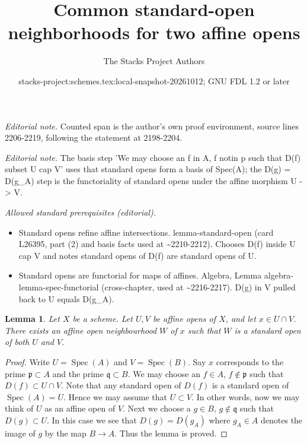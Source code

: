 \documentclass{stacks-project}
\title{Common standard-open neighborhoods for two affine opens}
\author{The Stacks Project Authors}
\date{stacks-project:schemes.tex:local-snapshot-20261012; GNU FDL 1.2 or later}
\theoremstyle{plain}
\newtheorem{lemma}[subsection]{Lemma}
\theoremstyle{definition}
\theoremstyle{remark}
\numberwithin{equation}{subsection}
\def\Spec{\mathop{\mathrm{Spec}}}
\begin{document}
\maketitle
\noindent\textit{Editorial note.} Counted span is the author's own proof environment, source lines 2206-2219, following the statement at 2198-2204.\par\medskip
\noindent\textit{Editorial note.} The basis step 'We may choose an f in A, f notin p such that D(f) subset U cap V' uses that standard opens form a basis of Spec(A); the D(g) = D(g\_A) step is the functoriality of standard opens under the affine morphism U -> V.\par\medskip
\noindent\textit{Allowed standard prerequisites (editorial).}\begin{itemize}
\item Standard opens refine affine intersections. lemma-standard-open (card L26395, part (2) and basis facts used at \textasciitilde{}2210-2212). Chooses D(f) inside U cap V and notes standard opens of D(f) are standard opens of U.
\item Standard opens are functorial for maps of affines. Algebra, Lemma algebra-lemma-spec-functorial (cross-chapter, used at \textasciitilde{}2216-2217). D(g) in V pulled back to U equals D(g\_A).
\end{itemize}\medskip
\begin{lemma}
\label{lemma-standard-open-two-affines}
Let $X$ be a scheme.
Let $U, V$ be affine opens of $X$, and let $x \in U \cap V$.
There exists an affine open neighbourhood $W$ of $x$
such that $W$ is a standard open of both $U$ and $V$.
\end{lemma}

\begin{proof}
Write $U = \Spec(A)$ and $V = \Spec(B)$.
Say $x$ corresponds to the prime $\mathfrak p \subset A$
and the prime $\mathfrak q \subset B$.
We may choose an $f \in A$, $f \not \in \mathfrak p$ such that
$D(f) \subset U \cap V$. Note that any standard open of $D(f)$
is a standard open of $\Spec(A) = U$. Hence we may assume
that $U \subset V$. In other words, now we may think of $U$
as an affine open of $V$. Next we choose a
$g \in B$, $g \not \in \mathfrak q$ such that
$D(g) \subset U$. In this case we see that $D(g) = D(g_A)$
where $g_A \in A$ denotes the image of $g$ by the map $B \to A$.
Thus the lemma is proved.
\end{proof}
\end{document}
